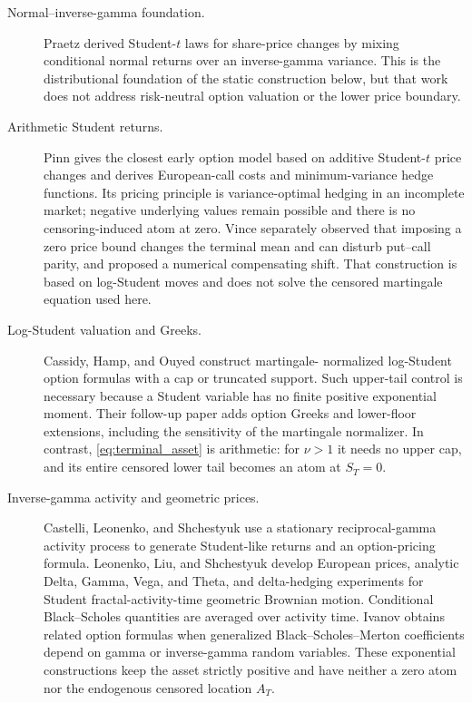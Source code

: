\documentclass[11pt,a4paper]{article}
\begin{document}
\begin{description}
  \item[Normal--inverse-gamma foundation.]
  Praetz \cite{Praetz1972} derived Student-$t$ laws for share-price changes by
  mixing conditional normal returns over an inverse-gamma variance.  This is
  the distributional foundation of the static construction below, but that
  work does not address risk-neutral option valuation or the lower price
  boundary.

  \item[Arithmetic Student returns.]
  Pinn \cite{Pinn2000} gives the closest early option model based on additive
  Student-$t$ price changes and derives European-call costs and
  minimum-variance hedge functions.  Its pricing principle is
  variance-optimal hedging in an incomplete market; negative underlying values
  remain possible and there is no censoring-induced atom at zero.  Vince
  \cite{Vince1992} separately observed that imposing a zero price bound changes
  the terminal mean and can disturb put--call parity, and proposed a numerical
  compensating shift.  That construction is based on log-Student moves and
  does not solve the censored martingale equation used here.

  \item[Log-Student valuation and Greeks.]
  Cassidy, Hamp, and Ouyed \cite{CassidyHampOuyed2010} construct martingale-
  normalized log-Student option formulas with a cap or truncated support.
  Such upper-tail control is necessary because a Student variable has no
  finite positive exponential moment.  Their follow-up paper
  \cite{CassidyHampOuyed2013} adds option Greeks and lower-floor extensions,
  including the sensitivity of the martingale normalizer.  In contrast,
  \eqref{eq:terminal_asset} is arithmetic: for $\nu>1$ it needs no upper cap,
  and its entire censored lower tail becomes an atom at $S_T=0$.

  \item[Inverse-gamma activity and geometric prices.]
  Castelli, Leonenko, and Shchestyuk
  \cite{CastelliLeonenkoShchestyuk2017} use a stationary reciprocal-gamma
  activity process to generate Student-like returns and an option-pricing
  formula.  Leonenko, Liu, and Shchestyuk
  \cite{LeonenkoLiuShchestyuk2025} develop European prices, analytic Delta,
  Gamma, Vega, and Theta, and delta-hedging experiments for Student
  fractal-activity-time geometric Brownian motion.  Conditional
  Black--Scholes quantities are averaged over activity time.  Ivanov
  \cite{Ivanov2023} obtains related option formulas when generalized
  Black--Scholes--Merton coefficients depend on gamma or inverse-gamma random
  variables.  These exponential constructions keep the asset strictly
  positive and have neither a zero atom nor the endogenous censored location
  $A_T$.


\end{description}
\end{document}
